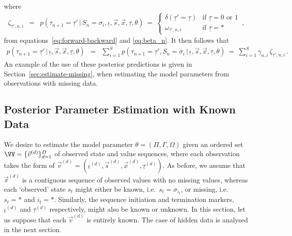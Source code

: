 \documentclass[a4paper]{article}
\newcommand{\ui}{\underline{\iota}}
\newcommand{\ut}{\underline{\tau}}
\begin{document}
where
\begin{eqnarray}
  \zeta_{\ut',n,i} & = &
    p(\tau_{n+1}\!=\!\ut'\,|\,S_n\!=\!\sigma_i,\ui,\vec{s},\vec{x},\ut,\theta) 
~=~\left\{\begin{array}{ll}
\delta(\ut'\!=\!\ut) & \mbox{if } \ut=0 \mbox{ or } 1\\
\omega_{\ut',n,i} & \mbox{if } \ut=*
\end{array}\right.\,,
\end{eqnarray}
from equations~\eqref{eq:forward-backward} and \eqref{eq:beta_n}. It then follows that
\begin{eqnarray}
    p(\tau_{n+1}\!=\!\ut'\,|\,\ui,\vec{s},\vec{x},\ut,\theta) 
& = &
    \sum_{i=1}^S p(\tau_{n+1}\!=\!\ut',S_n\!=\!\sigma_i\,|\,\ui,\vec{s},\vec{x},\ut,\theta) 
~=~\sum_{i=1}^S \gamma_{n,i}\,\zeta_{\ut',n,i}
\,.
\end{eqnarray}
An example of the use of these posterior predictions is given in Section~\ref{sec:estimate-missing}, when estimating the model parameters from 
observations with missing data.

\subsection{Posterior Parameter Estimation with Known Data}\label{sec:estimate-known}

We desire to estimate the model parameter $\theta=(\Pi,\Gamma,\Omega)$ given an 
ordered set $\VV=\{\vec{v}^{(d)}\}_{d=1}^{D}$ of observed state and value sequences,
where each observation takes the form of $\vec{v}^{(d)}=(\ui^{(d)},\vec{s}^{(d)},\vec{x}^{(d)},\ut^{(d)})$.
As before, we assume that $\vec{x}^{(d)}$ is a contiguous sequence of observed values with no missing values, whereas each `observed' state
$s_t$ might either be known, i.e.\ $s_t=\sigma_{i_t}$, or missing, i.e.\ $s_t=*$ and $i_t=*$.
Similarly, the sequence initiation and termination markers, $\ui^{(d)}$ and $\ut^{(d)}$ respectively,
might also be known or unknown.
In this section, let us suppose that each $\vec{v}^{(d)}$ is entirely known. The case of hidden data is analysed in the next section.
\end{document}
